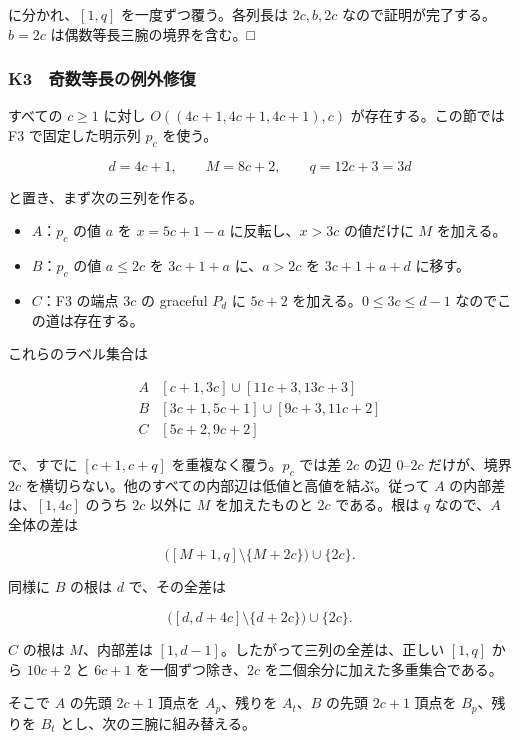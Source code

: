 \documentclass[
  10pt,
  a4paper,
]{article}
\providecommand{\tightlist}{%
  \setlength{\itemsep}{0pt}\setlength{\parskip}{0pt}}
\begin{document}
に分かれ、\([1,q]\) を一度ずつ覆う。各列長は \(2c,b,2c\)
なので証明が完了する。\(b=2c\) は偶数等長三腕の境界を含む。□

\subsubsection{K3　奇数等長の例外修復}\label{k3-ux5947ux6570ux7b49ux9577ux306eux4f8bux5916ux4feeux5fa9}

すべての \(c\ge1\) に対し \(O((4c+1,4c+1,4c+1),c)\)
が存在する。この節ではF3 で固定した明示列 \(p_c\) を使う。

\[
d=4c+1,\qquad M=8c+2,\qquad q=12c+3=3d
\]

と置き、まず次の三列を作る。

\begin{itemize}
\tightlist
\item
  \(A\)：\(p_c\) の値 \(a\) を \(x=5c+1-a\) に反転し、\(x>3c\)
  の値だけに \(M\) を加える。
\item
  \(B\)：\(p_c\) の値 \(a\le2c\) を \(3c+1+a\) に、\(a>2c\) を
  \(3c+1+a+d\) に移す。
\item
  \(C\)：F3 の端点 \(3c\) の graceful \(P_d\) に \(5c+2\)
  を加える。\(0\le3c\le d-1\) なのでこの道は存在する。
\end{itemize}

これらのラベル集合は

\[
\begin{array}{c|l}
A&[c+1,3c]\cup[11c+3,13c+3]\\
B&[3c+1,5c+1]\cup[9c+3,11c+2]\\
C&[5c+2,9c+2]
\end{array}
\]

で、すでに \([c+1,c+q]\) を重複なく覆う。\(p_c\) では差 \(2c\) の辺
\(0\)--\(2c\) だけが、境界 \(2c\)
を横切らない。他のすべての内部辺は低値と高値を結ぶ。従って \(A\)
の内部差は、\([1,4c]\) のうち \(2c\) 以外に \(M\) を加えたものと \(2c\)
である。根は \(q\) なので、\(A\) 全体の差は

\[
\bigl([M+1,q]\setminus\{M+2c\}\bigr)\cup\{2c\}.
\]

同様に \(B\) の根は \(d\) で、その全差は

\[
\bigl([d,d+4c]\setminus\{d+2c\}\bigr)\cup\{2c\}.
\]

\(C\) の根は \(M\)、内部差は \([1,d-1]\)。したがって三列の全差は、正しい
\([1,q]\) から \(10c+2\) と \(6c+1\) を一個ずつ除き、\(2c\)
を二個余分に加えた多重集合である。

そこで \(A\) の先頭 \(2c+1\) 頂点を \(A_p\)、残りを \(A_t\)、\(B\)
の先頭 \(2c+1\) 頂点を \(B_p\)、残りを \(B_t\)
とし、次の三腕に組み替える。
\end{document}
